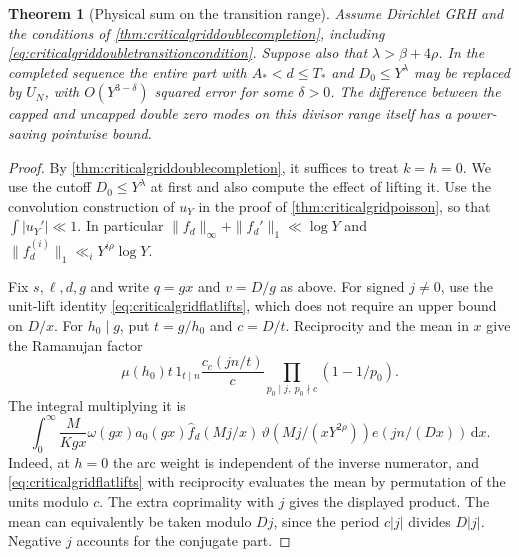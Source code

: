 \documentclass[11pt,a4paper]{article}
\numberwithin{equation}{section}
\newtheorem{theorem}{Theorem}[section]
\newcommand{\ud}{\mathrm d}
\begin{document}
\begin{theorem}[Physical sum on the transition range]
\label{thm:criticalgriddoublezero}
Assume Dirichlet GRH and the conditions of
\cref{thm:criticalgriddoublecompletion}, including
\cref{eq:criticalgriddoubletransitioncondition}. Suppose
also that $\lambda>\beta+4\rho$.
In the completed sequence the entire part with
$A_*<d\le T_*$ and $D_0\le Y^\lambda$ may be replaced
by $U_N$, with $O(Y^{3-\delta})$ squared error for some
$\delta>0$. The difference between the capped and uncapped
double zero modes on this divisor range itself has a
power-saving pointwise bound.
\end{theorem}

\begin{proof}
By \cref{thm:criticalgriddoublecompletion}, it suffices
to treat $k=h=0$. We use the cutoff $D_0\le Y^\lambda$
at first and also compute the effect of lifting it.
Use the convolution construction of $u_Y$ in the proof
of \cref{thm:criticalgridpoisson}, so that
$\int|u_Y'|\ll1$. In particular
$\|f_d\|_\infty+\|f_d'\|_1\ll\log Y$ and
$\|f_d^{(i)}\|_1\ll_i Y^{i\rho}\log Y$.

Fix $s,\ell,d,g$ and write $q=gx$ and $v=D/g$ as above.
For signed $j\ne0$, use the unit-lift identity
\cref{eq:criticalgridflatlifts}, which does not require an
upper bound on $D/x$. For $h_0\mid g$, put $t=g/h_0$
and $c=D/t$. Reciprocity and the mean in $x$ give the
Ramanujan factor
\begin{equation}
 \mu(h_0)t\,1_{t\mid n}\frac{c_c(jn/t)}c
                 \prod_{p_0\mid j,\ p_0\nmid c}(1-1/p_0).
 \label{eq:criticalgriddoublezero-ramanujan}
\end{equation}
The integral multiplying it is
\[
 \int_0^\infty \frac{M}{K g x}\omega(gx)a_0(gx)
   \widehat f_d(Mj/x)\,\vartheta(Mj/(xY^{2\rho}))
                     e(jn/(Dx))\,\ud x .
\]
Indeed, at $h=0$ the arc weight is independent of the
inverse numerator, and \cref{eq:criticalgridflatlifts}
with reciprocity evaluates the mean by permutation of
the units modulo $c$. The extra coprimality with $j$
gives the displayed product. The mean can equivalently
be taken modulo $Dj$, since the period $c|j|$ divides
$D|j|$. Negative $j$ accounts for the conjugate part.


\end{proof}
\end{document}
